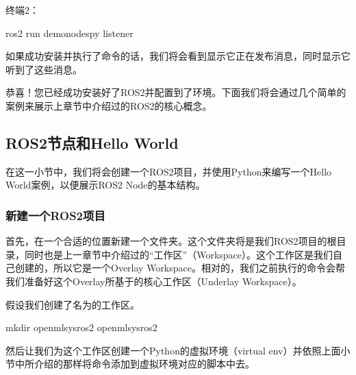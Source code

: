 \documentclass[letterpaper,10pt,english]{sphinxmanual}
\begin{document}
\sphinxAtStartPar
终端2：

\begin{sphinxVerbatim}[commandchars=\\\{\}]
ros2 run demo\PYGZus{}nodes\PYGZus{}py listener
\end{sphinxVerbatim}

\sphinxAtStartPar
如果成功安装并执行了命令的话，我们将会看到显示它正在发布消息，同时显示它听到了这些消息。

\sphinxAtStartPar
恭喜！您已经成功安装好了ROS2并配置到了环境。下面我们将会通过几个简单的案例来展示上章节中介绍过的ROS2的核心概念。


\subsection{ROS2节点和Hello World}
\label{\detokenize{chapter_rl_sys/ros_code_ex:ros2hello-world}}
\sphinxAtStartPar
在这一小节中，我们将会创建一个ROS2项目，并使用Python来编写一个Hello
World案例，以便展示ROS2 Node的基本结构。


\subsubsection{新建一个ROS2项目}
\label{\detokenize{chapter_rl_sys/ros_code_ex:id4}}
\sphinxAtStartPar
首先，在一个合适的位置新建一个文件夹。这个文件夹将是我们ROS2项目的根目录，同时也是上一章节中介绍过的“工作区”（Workspace）。这个工作区是我们自己创建的，所以它是一个Overlay
Workspace。相对的，我们之前执行的命令会帮我们准备好这个Overlay所基于的核心工作区（Underlay
Workspace）。

\sphinxAtStartPar
假设我们创建了名为的工作区。

\begin{sphinxVerbatim}[commandchars=\\\{\}]
mkdir openmlsys\PYGZhy{}ros2
 openmlsys\PYGZhy{}ros2
\end{sphinxVerbatim}

\sphinxAtStartPar
然后让我们为这个工作区创建一个Python的虚拟环境（virtual
env）并依照上面小节中所介绍的那样将命令添加到虚拟环境对应的脚本中去。

\sphinxAtStartPar
{}
\end{document}
